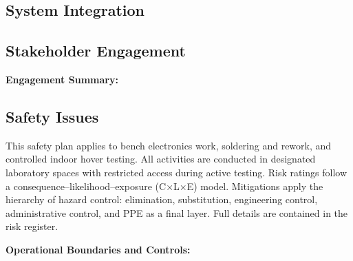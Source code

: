 \subsection{System Integration}

\subsection{Stakeholder Engagement}
\textbf{Engagement Summary:}


\subsection{Safety Issues}
This safety plan applies to bench electronics work, soldering and rework, and controlled indoor hover testing. All activities are conducted in designated laboratory spaces with restricted access during active testing. Risk ratings follow a consequence–likelihood–exposure (C×L×E) model. Mitigations apply the hierarchy of hazard control: elimination, substitution, engineering control, administrative control, and PPE as a final layer. Full details are contained in the risk register.

\vspace{0.5em}
\textbf{Operational Boundaries and Controls:}

